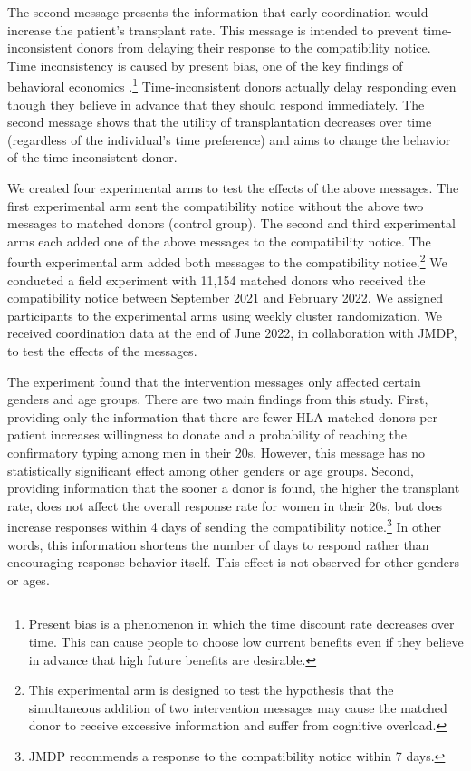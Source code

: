 \documentclass[
]{article}
\begin{document}
The second message presents the information that early coordination would increase the patient's transplant rate. This message is intended to prevent time-inconsistent donors from delaying their response to the compatibility notice. Time inconsistency is caused by present bias, one of the key findings of behavioral economics \citep{Laibson1997, ODonoghue2001}.\footnote{Present bias is a phenomenon in which the time discount rate decreases over time. This can cause people to choose low current benefits even if they believe in advance that high future benefits are desirable.} Time-inconsistent donors actually delay responding even though they believe in advance that they should respond immediately. The second message shows that the utility of transplantation decreases over time (regardless of the individual's time preference) and aims to change the behavior of the time-inconsistent donor.

We created four experimental arms to test the effects of the above messages. The first experimental arm sent the compatibility notice without the above two messages to matched donors (control group). The second and third experimental arms each added one of the above messages to the compatibility notice. The fourth experimental arm added both messages to the compatibility notice.\footnote{This experimental arm is designed to test the hypothesis that the simultaneous addition of two intervention messages may cause the matched donor to receive excessive information and suffer from cognitive overload.} We conducted a field experiment with 11,154 matched donors who received the compatibility notice between September 2021 and February 2022. We assigned participants to the experimental arms using weekly cluster randomization. We received coordination data at the end of June 2022, in collaboration with JMDP, to test the effects of the messages.

The experiment found that the intervention messages only affected certain genders and age groups. There are two main findings from this study. First, providing only the information that there are fewer HLA-matched donors per patient increases willingness to donate and a probability of reaching the confirmatory typing among men in their 20s. However, this message has no statistically significant effect among other genders or age groups. Second, providing information that the sooner a donor is found, the higher the transplant rate, does not affect the overall response rate for women in their 20s, but does increase responses within 4 days of sending the compatibility notice.\footnote{JMDP recommends a response to the compatibility notice within 7 days.} In other words, this information shortens the number of days to respond rather than encouraging response behavior itself. This effect is not observed for other genders or ages.
\end{document}
